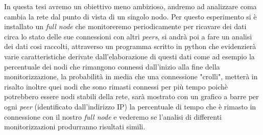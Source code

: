 In questa tesi avremo un obiettivo meno ambizioso, andremo ad analizzare coma cambia la rete dal punto di vista di un singolo nodo. Per questo esperimento si \`e installato un \textit{full node} che monitoreremo periodicamente per ricavare dei dati circa lo stato delle sue connessioni con altri \textit{peers}, si andr\`a poi a fare un analisi dei dati cosi raccolti, attraverso un programma scritto in python che evidenzier\`a varie caratteristiche derivate dall'elaborazione di questi dati come ad esempio la percentuale dei nodi che rimangono connessi dall'inizio alla fine della monitorizzazione, la probabilit\`a in media che una connessione "crolli", metter\`a in risalto inoltre quei nodi che sono rimasti connessi per pi\`u tempo poich\`e potrebbero essere nodi stabili della rete, sar\`a mostrato con un grafico a barre per ogni \textit{peer} (identificato dall'indirizzo IP) la percentuale di tempo che \`e rimasto in connessione con il nostro \textit{full node} e vederemo se l'analisi di differenti monitorizzazioni produrranno risultati simili.





